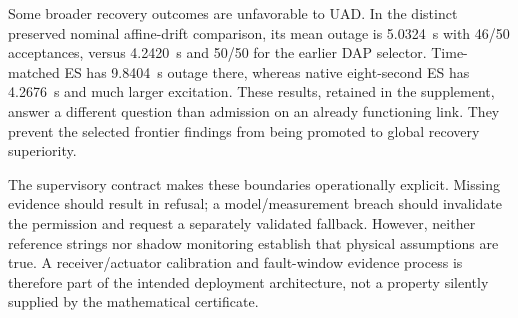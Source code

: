 Some broader recovery outcomes are unfavorable to UAD. In the distinct preserved nominal affine-drift comparison, its mean outage is 5.0324~s with 46/50 acceptances, versus 4.2420~s and 50/50 for the earlier DAP selector. Time-matched ES has 9.8404~s outage there, whereas native eight-second ES has 4.2676~s and much larger excitation. These results, retained in the supplement, answer a different question than admission on an already functioning link. They prevent the selected frontier findings from being promoted to global recovery superiority.

The supervisory contract makes these boundaries operationally explicit. Missing evidence should result in refusal; a model/measurement breach should invalidate the permission and request a separately validated fallback. However, neither reference strings nor shadow monitoring establish that physical assumptions are true. A receiver/actuator calibration and fault-window evidence process is therefore part of the intended deployment architecture, not a property silently supplied by the mathematical certificate.
